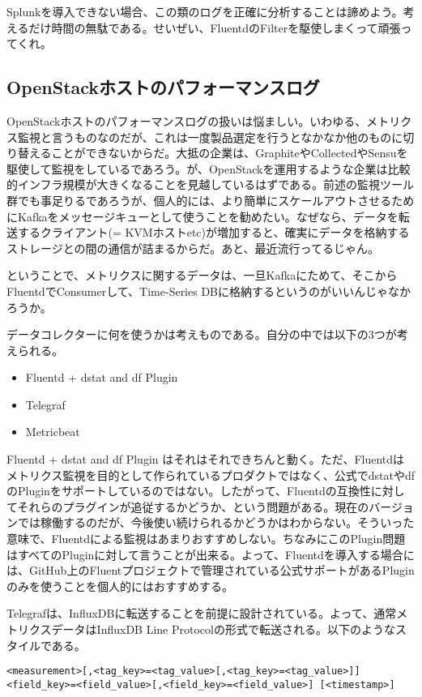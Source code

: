 Splunkを導入できない場合、この類のログを正確に分析することは諦めよう。考えるだけ時間の無駄である。せいぜい、FluentdのFilterを駆使しまくって頑張ってくれ。


\subsection{OpenStackホストのパフォーマンスログ}
OpenStackホストのパフォーマンスログの扱いは悩ましい。いわゆる、メトリクス監視と言うものなのだが、これは一度製品選定を行うとなかなか他のものに切り替えることができないからだ。大抵の企業は、GraphiteやCollectedやSensuを駆使して監視をしているであろう。が、OpenStackを運用するような企業は比較的インフラ規模が大きくなることを見越しているはずである。前述の監視ツール群でも事足りるであろうが、個人的には、より簡単にスケールアウトさせるためにKafkaをメッセージキューとして使うことを勧めたい。なぜなら、データを転送するクライアント(= KVMホストetc)が増加すると、確実にデータを格納するストレージとの間の通信が詰まるからだ。あと、最近流行ってるじゃん。

ということで、メトリクスに関するデータは、一旦Kafkaにためて、そこからFluentdでConsumerして、Time-Series DBに格納するというのがいいんじゃなかろうか。

データコレクターに何を使うかは考えものである。自分の中では以下の3つが考えられる。

\begin{itemize}
	\item Fluentd + dstat and df Plugin
	\item Telegraf
	\item Metricbeat
\end{itemize}

Fluentd + dstat and df Plugin はそれはそれできちんと動く。ただ、Fluentdはメトリクス監視を目的として作られているプロダクトではなく、公式でdstatやdfのPluginをサポートしているのではない。したがって、Fluentdの互換性に対してそれらのプラグインが追従するかどうか、という問題がある。現在のバージョンでは稼働するのだが、今後使い続けられるかどうかはわからない。そういった意味で、Fluentdによる監視はあまりおすすめしない。ちなみにこのPlugin問題はすべてのPluginに対して言うことが出来る。よって、Fluentdを導入する場合には、GitHub上のFluentプロジェクトで管理されている公式サポートがあるPluginのみを使うことを個人的にはおすすめする。

Telegrafは、InfluxDBに転送することを前提に設計されている。よって、通常メトリクスデータはInfluxDB Line Protocolの形式で転送される。以下のようなスタイルである。

\begin{lstlisting}
<measurement>[,<tag_key>=<tag_value>[,<tag_key>=<tag_value>]] <field_key>=<field_value>[,<field_key>=<field_value>] [<timestamp>]
\end{lstlisting}

